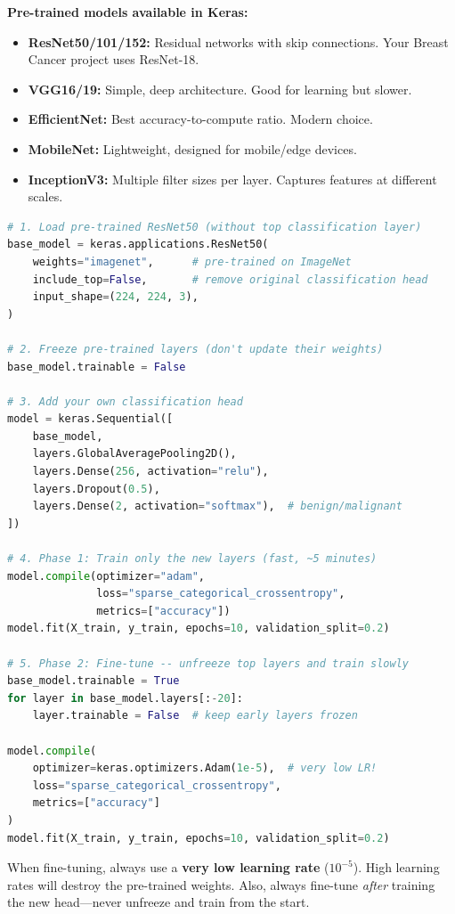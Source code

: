 \documentclass[12pt, a4paper, oneside]{book}
\begin{document}
\textbf{Pre-trained models available in Keras:}
\begin{itemize}[leftmargin=2em]
    \item \textbf{ResNet50/101/152:} Residual networks with skip connections. Your Breast Cancer project uses ResNet-18.
    \item \textbf{VGG16/19:} Simple, deep architecture. Good for learning but slower.
    \item \textbf{EfficientNet:} Best accuracy-to-compute ratio. Modern choice.
    \item \textbf{MobileNet:} Lightweight, designed for mobile/edge devices.
    \item \textbf{InceptionV3:} Multiple filter sizes per layer. Captures features at different scales.
\end{itemize}

\begin{lstlisting}[language=Python, caption={Transfer learning with ResNet50}]
# 1. Load pre-trained ResNet50 (without top classification layer)
base_model = keras.applications.ResNet50(
    weights="imagenet",      # pre-trained on ImageNet
    include_top=False,       # remove original classification head
    input_shape=(224, 224, 3),
)

# 2. Freeze pre-trained layers (don't update their weights)
base_model.trainable = False

# 3. Add your own classification head
model = keras.Sequential([
    base_model,
    layers.GlobalAveragePooling2D(),
    layers.Dense(256, activation="relu"),
    layers.Dropout(0.5),
    layers.Dense(2, activation="softmax"),  # benign/malignant
])

# 4. Phase 1: Train only the new layers (fast, ~5 minutes)
model.compile(optimizer="adam",
              loss="sparse_categorical_crossentropy",
              metrics=["accuracy"])
model.fit(X_train, y_train, epochs=10, validation_split=0.2)

# 5. Phase 2: Fine-tune -- unfreeze top layers and train slowly
base_model.trainable = True
for layer in base_model.layers[:-20]:
    layer.trainable = False  # keep early layers frozen

model.compile(
    optimizer=keras.optimizers.Adam(1e-5),  # very low LR!
    loss="sparse_categorical_crossentropy",
    metrics=["accuracy"]
)
model.fit(X_train, y_train, epochs=10, validation_split=0.2)
\end{lstlisting}

\begin{warningbox}
When fine-tuning, always use a \textbf{very low learning rate} ($10^{-5}$). High learning rates will destroy the pre-trained weights. Also, always fine-tune \emph{after} training the new head---never unfreeze and train from the start.
\end{warningbox}
\end{document}
